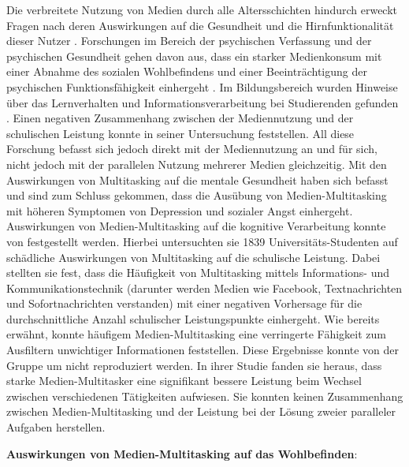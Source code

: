 Die verbreitete Nutzung von Medien durch alle Altersschichten hindurch erweckt Fragen nach deren Auswirkungen auf die Gesundheit und die Hirnfunktionalität dieser Nutzer . Forschungen im Bereich der psychischen Verfassung und der psychischen Gesundheit gehen davon aus, dass ein starker Medienkonsum mit einer Abnahme des sozialen Wohlbefindens und einer Beeinträchtigung der psychischen Funktionsfähigkeit einhergeht \cite{Kraut1998, Moody2001}. Im Bildungsbereich wurden Hinweise über das Lernverhalten und Informationsverarbeitung bei Studierenden gefunden \cite{Prensky2001}. Einen negativen Zusammenhang zwischen der Mediennutzung und der schulischen Leistung konnte  in seiner Untersuchung feststellen. All diese Forschung befasst sich jedoch direkt mit der Mediennutzung an und für sich, nicht jedoch mit der parallelen Nutzung mehrerer Medien gleichzeitig. Mit den Auswirkungen von Multitasking auf die mentale Gesundheit haben sich  befasst und sind zum Schluss gekommen, dass die Ausübung von Medien-Multitasking mit höheren Symptomen von Depression und sozialer Angst einhergeht. Auswirkungen von Medien-Multitasking auf die kognitive Verarbeitung konnte von  festgestellt werden. Hierbei untersuchten sie 1839 Universitäts-Studenten auf schädliche Auswirkungen von Multitasking auf die schulische Leistung. Dabei stellten sie fest, dass die Häufigkeit von Multitasking mittels Informations- und Kommunikationstechnik (darunter werden Medien wie Facebook, Textnachrichten und Sofortnachrichten verstanden) mit einer negativen Vorhersage für die durchschnittliche Anzahl schulischer Leistungspunkte einhergeht. Wie bereits erwähnt, konnte  häufigem Medien-Multitasking eine verringerte Fähigkeit zum Ausfiltern unwichtiger Informationen feststellen. Diese Ergebnisse konnte von der Gruppe um  nicht reproduziert werden. In ihrer Studie fanden sie heraus, dass starke Medien-Multitasker eine signifikant bessere Leistung beim Wechsel zwischen verschiedenen Tätigkeiten aufwiesen. Sie konnten keinen Zusammenhang zwischen Medien-Multitasking und der Leistung bei der Lösung zweier paralleler Aufgaben herstellen. 
\par
\textbf{Auswirkungen von Medien-Multitasking auf das Wohlbefinden}: 
